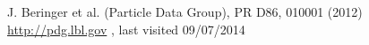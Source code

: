 \begin{thebibliography}{99}\fontsize{12}{16.4} \selectfont

 J. Beringer et al. (Particle Data Group), PR D86, 010001 (2012) \url{http://pdg.lbl.gov} , last visited 09/07/2014
\end{thebibliography}
